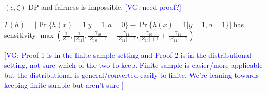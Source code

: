 \documentclass[format = sigconf]{acmart}
\newcommand{\vg}[1]{\textcolor{blue}{[VG: #1]}}
\newcommand{\1}{\mathbbm{1}}
\newcommand{\eps}{\epsilon}
\newcommand{\zt}{\zeta}
\newcommand{\z}[1]{Z_{#1}}
\theoremstyle{definition}
\begin{document}
\begin{lemma}
  $(\eps, \zt)$-DP and fairness is impossible. \vg{need proof?}
\end{lemma}




\begin{corollary} $\Gamma(h) = |\Pr\{h(x) = 1 | y=1, a =0\} - \Pr\{h(x) = 1 | y = 1, a = 1\}|$ has sensitivity $\max(\frac{1}{\z{10}},\frac{1}{|Z_{11}|}, \frac{\gamma_{10}}{|\z{10}|-1} + \frac{\gamma_{11}}{|Z_{11}|+1}, \frac{\gamma_{10}}{|\z{10}|+1} + \frac{\gamma_{11}}{|Z_{11}|-1})$
\end{corollary}

\vg{Proof 1 is in the finite sample setting and Proof 2 is in the distributional setting, not sure which of the two to keep. Finite sample is easier/more applicable but the distributional is general/converted easily to finite. We're leaning towards keeping finite sample but aren't sure }
\end{document}
